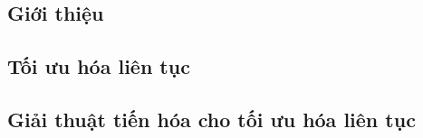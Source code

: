 \subsection{Giới thiệu}
\label{section:cea}

\subsection{Tối ưu hóa liên tục}

\subsection{Giải thuật tiến hóa cho tối ưu hóa liên tục}

% 
